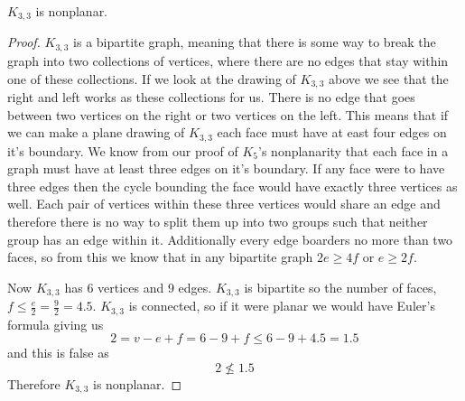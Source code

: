 \documentclass{article}
\begin{document}
\begin{theorem}
	$K_{3,3}$ is nonplanar.
\end{theorem}
\begin{center}
		
\end{center}
\begin{proof}
	$K_{3,3}$ is a bipartite graph, meaning that there is some way to break the graph into two collections of vertices, where there are no edges that stay within one of these collections. If we look at the drawing of $K_{3,3}$ above we see that the right and left works as these collections for us. There is no edge that goes between two vertices on the right or two vertices on the left. This means that if we can make a plane drawing of $K_{3,3}$ each face must have at east four edges on it's boundary. We know from our proof of $K_5$'s nonplanarity that each face in a graph must have at least three edges on it's boundary. If any face were to have three edges then the cycle bounding the face would have exactly three vertices as well. Each pair of vertices within these three vertices would share an edge and therefore there is no way to split them up into two groups such that neither group has an edge within it. Additionally every edge boarders no more than two faces, so from this we know that in any bipartite graph $2e \ge 4f$ or $e\ge 2f$.
	
	Now $K_{3,3}$ has 6 vertices and 9 edges. $K_{3,3}$ is bipartite so the number of faces, $f \le \frac e2 = \frac92 = 4.5$. $K_{3,3}$ is connected, so if it were planar we would have Euler's formula giving us $$2=v-e+f=6-9+f\le6-9+4.5=1.5$$ and this is false as $$2\not\le1.5$$ Therefore $K_{3,3}$ is nonplanar.
\end{proof}


\printnoidxglossary



\end{document}
